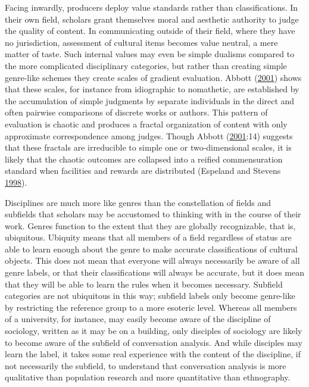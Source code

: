 \documentclass[]{book}
\theoremstyle{definition}
\theoremstyle{definition}
\theoremstyle{definition}
\theoremstyle{remark}
\begin{document}
Facing inwardly, producers deploy value standards rather than
classifications. In their own field, scholars grant themselves moral and
aesthetic authority to judge the quality of content. In communicating
outside of their field, where they have no jurisdiction, assessment of
cultural items becomes value neutral, a mere matter of taste. Such
internal values may even be simple dualisms compared to the more
complicated disciplinary categories, but rather than creating simple
genre-like schemes they create scales of gradient evaluation. Abbott
(\protect\hyperlink{ref-Abbott2001Chaos}{2001}) shows that these scales,
for instance from idiographic to nomathetic, are established by the
accumulation of simple judgments by separate individuals in the direct
and often pairwise comparisons of discrete works or authors. This
pattern of evaluation is chaotic and produces a fractal organization of
content with only approximate correspondence among judges. Though Abbott
(\protect\hyperlink{ref-Abbott2001Chaos}{2001}:14) suggests that these
fractals are irreducible to simple one or two-dimensional scales, it is
likely that the chaotic outcomes are collapsed into a reified
commensuration standard when facilities and rewards are distributed
(Espeland and Stevens
\protect\hyperlink{ref-Espeland1998Commensuration}{1998}).

Disciplines are much more like genres than the constellation of fields
and subfields that scholars may be accustomed to thinking with in the
course of their work. Genres function to the extent that they are
globally recognizable, that is, ubiquitous. Ubiquity means that all
members of a field regardless of status are able to learn enough about
the genre to make accurate classifications of cultural objects. This
does not mean that everyone will always necessarily be aware of all
genre labels, or that their classifications will always be accurate, but
it does mean that they will be able to learn the rules when it becomes
necessary. Subfield categories are not ubiquitous in this way; subfield
labels only become genre-like by restricting the reference group to a
more esoteric level. Whereas all members of a university, for instance,
may easily become aware of the discipline of sociology, written as it
may be on a building, only disciples of sociology are likely to become
aware of the subfield of conversation analysis. And while disciples may
learn the label, it takes some real experience with the content of the
discipline, if not necessarily the subfield, to understand that
conversation analysis is more qualitative than population research and
more quantitative than ethnography.
\end{document}
